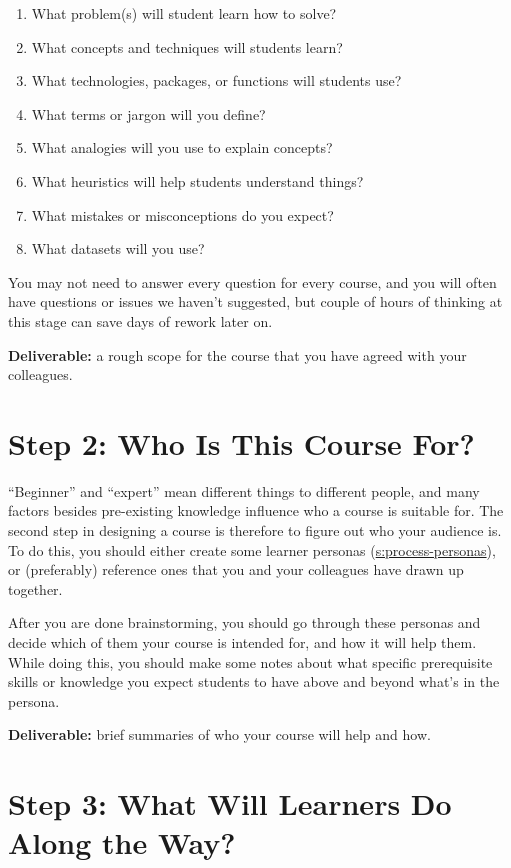 \begin{enumerate}
\item
  What problem(s) will student learn how to solve?
\item
  What concepts and techniques will students learn?
\item
  What technologies, packages, or functions will students use?
\item
  What terms or jargon will you define?
\item
  What analogies will you use to explain concepts?
\item
  What heuristics will help students understand things?
\item
  What mistakes or misconceptions do you expect?
\item
  What datasets will you use?
\end{enumerate}

You may not need to answer every question for every course, and you will
often have questions or issues we haven't suggested, but couple of hours
of thinking at this stage can save days of rework later on.

\textbf{Deliverable:} a rough scope for the course that you have agreed with
your colleagues.

\section{Step 2: Who Is This Course For?}\label{step-2-who-is-this-course-for}

``Beginner'' and ``expert'' mean different things to different people, and
many factors besides pre-existing knowledge influence who a course is
suitable for. The second step in designing a course is therefore to
figure out who your audience is. To do this, you should either create
some learner personas (\protect\hyperlink{SECTION}{s:process-personas}), or (preferably)
reference ones that you and your colleagues have drawn up together.

After you are done brainstorming, you should go through these personas
and decide which of them your course is intended for, and how it will
help them. While doing this, you should make some notes about what
specific prerequisite skills or knowledge you expect students to have
above and beyond what's in the persona.

\textbf{Deliverable:} brief summaries of who your course will help and how.

\section{Step 3: What Will Learners Do Along the Way?}\label{step-3-what-will-learners-do-along-the-way}

